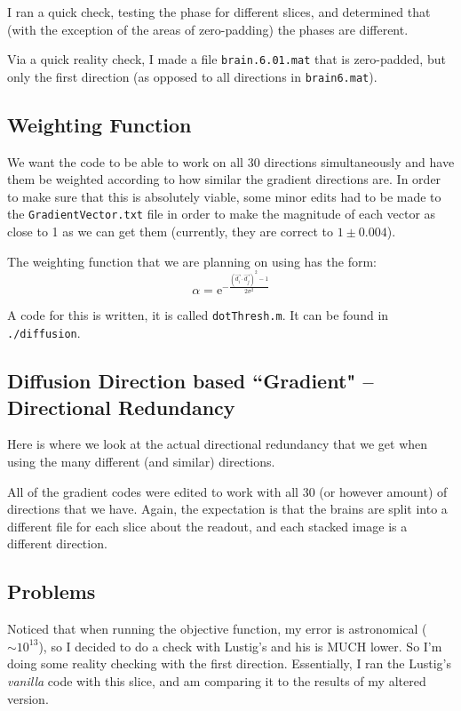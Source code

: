 \documentclass[11 pt]{article}
\newcommand{\me}{\mathrm{e}}
\begin{document}
    I ran a quick check, testing the phase for different slices, and determined that (with the exception of the areas of zero-padding) the phases are different. 

    Via a quick reality check, I made a file \texttt{brain.6.01.mat} that is zero-padded, but only the first direction (as opposed to all directions in \texttt{brain6.mat}).

  \subsection{Weighting Function}
    We want the code to be able to work on all 30 directions simultaneously and have them be weighted according to how similar the gradient directions are. In order to make sure that this is absolutely viable, some minor edits had to be made to the \texttt{GradientVector.txt} file in order to make the magnitude of each vector as close to 1 as we can get them (currently, they are correct to $1 \pm 0.004$). 

    The weighting function that we are planning on using has the form:
    \[ \alpha = 
    \me^
    {-\frac{(\vec{d_i}\cdot\vec{d_j})^2 - 1}{2\sigma^2}} \]

    A code for this is written, it is called \texttt{dotThresh.m}. It can be found in \texttt{./diffusion}. 


  \subsection{Diffusion Direction based ``Gradient" -- Directional Redundancy}
    Here is where we look at the actual directional redundancy that we get when using the many different (and similar) directions. 

    All of the gradient codes were edited to work with all 30 (or however amount) of directions that we have. Again, the expectation is that the brains are split into a different file for each slice about the readout, and each stacked image is a different direction. 

  \subsection{Problems}
    Noticed that when running the objective function, my error is astronomical ($\sim 10^{13}$), so I decided to do a check with Lustig's and his is MUCH lower. So I'm doing some reality checking with the first direction. Essentially, I ran the Lustig's \emph{vanilla} code with this slice, and am comparing it to the results of my altered version.
\end{document}
